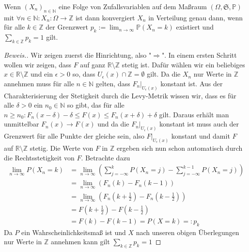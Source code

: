 \begin{lemma}
    Wenn $(X_n)_{n\in\mathbb{N}}$ eine Folge von Zufallsvariablen auf dem Maßraum $(\Omega,\mathfrak{S},\mathbb{P})$ mit $\forall n\in\mathbb{N}:X_n:\Omega\to\mathbb{Z}$ ist dann konvergiert $X_n$ in Verteilung genau dann, wenn für alle $k\in\mathbb{Z}$ der Grenzwert $p_k:=\lim_{n\to\infty}\mathbb{P}(X_n=k)$ existiert und $\sum_{k\in\mathbb{Z}}p_k=1$ gilt.
\end{lemma}
\begin{proof}[Beweis.]
    Wir zeigen zuerst die Hinrichtung, also "$\Rightarrow$". In einem ersten Schritt wollen wir zeigen, dass $F$ auf ganz $\mathbb{R}\setminus\mathbb{Z}$ stetig ist. Dafür wählen wir ein beliebiges $x\in\mathbb{R}\setminus\mathbb{Z}$ und ein $\epsilon>0$ so, dass $U_\epsilon(x)\cap\mathbb{Z}=\emptyset$ gilt. Da die $X_n$ nur Werte in $\mathbb{Z}$ annehmen muss für alle $n\in\mathbb{N}$ gelten, dass $F_n\vert_{U_\epsilon(x)}$ konstant ist. Aus der Charakterisierung der Stetigkeit durch die Levy-Metrik wissen wir, dass es für alle $\delta>0$ ein $n_0\in\mathbb{N}$ so gibt, das für alle $n\geq n_0:F_n(x-\delta)-\delta\leq F(x)\leq F_n(x+\delta)+\delta$ gilt. Daraus erhält man unmittelbar $F_n(x)\to F(x)$ und da die $F_n\vert_{U_\epsilon(x)}$ konstant ist muss auch der Grenzwert für alle Punkte der gleiche sein, also $F\vert_{U_\epsilon(x)}$ konstant und damit $F$ auf $\mathbb{R}\setminus\mathbb{Z}$ stetig. Die Werte von $F$ in $\mathbb{Z}$ ergeben sich nun schon automatisch durch die Rechtsstetigkeit von $F$. Betrachte dazu
    \begin{align*}
        \lim_{n\to\infty}P(X_n = k)&=\lim_{n\to\infty}\left(\sum_{j=-\infty}^kP(X_n=j)-\sum_{j=-\infty}^{k-1}P(X_n=j)\right)\\
        &=\lim_{n\to\infty}\left(F_n(k)-F_n(k-1)\right)\\
        &=\lim_{n\to\infty}\left(F_n\left(k+\frac{1}{2}\right)-F_n\left(k-\frac{1}{2}\right)\right)\\
        &=F\left(k+\frac{1}{2}\right)-F\left(k-\frac{1}{2}\right)\\
        &=F(k)-F(k-1)=P(X=k)=:p_k
    \end{align*}
    Da $P$ ein Wahrscheinlichkeitsmaß ist und $X$ nach unseren obigen Überlegungen nur Werte in $\mathbb{Z}$ annehmen kann gilt $\sum_{k\in\mathbb{Z}}p_k=1$


\end{proof}
